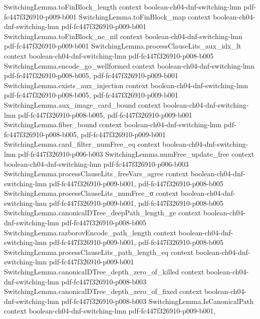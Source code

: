 \begin{lemma}
\proofstep
  {SwitchingLemma.toFinBlock_length}
  {context}
  {boolean-ch04-dnf-switching-lmn}
  {pdf-fc447f326910-p009-b001}
\proofstep
  {SwitchingLemma.toFinBlock_map}
  {context}
  {boolean-ch04-dnf-switching-lmn}
  {pdf-fc447f326910-p009-b001}
\proofstep
  {SwitchingLemma.toFinBlock_ne_nil}
  {context}
  {boolean-ch04-dnf-switching-lmn}
  {pdf-fc447f326910-p009-b001}
\proofstep
  {SwitchingLemma.processClauseLits_aux_idx_lt}
  {context}
  {boolean-ch04-dnf-switching-lmn}
  {pdf-fc447f326910-p008-b005}
\proofstep
  {SwitchingLemma.encode_go_wellformed}
  {context}
  {boolean-ch04-dnf-switching-lmn}
  {pdf-fc447f326910-p008-b005,
    pdf-fc447f326910-p009-b001}
\proofstep
  {SwitchingLemma.exists_aux_injection}
  {context}
  {boolean-ch04-dnf-switching-lmn}
  {pdf-fc447f326910-p008-b005,
    pdf-fc447f326910-p009-b001}
\proofstep
  {SwitchingLemma.aux_image_card_bound}
  {context}
  {boolean-ch04-dnf-switching-lmn}
  {pdf-fc447f326910-p008-b005,
    pdf-fc447f326910-p009-b001}
\proofstep
  {SwitchingLemma.fiber_bound}
  {context}
  {boolean-ch04-dnf-switching-lmn}
  {pdf-fc447f326910-p008-b005,
    pdf-fc447f326910-p009-b001}
\proofstep
  {SwitchingLemma.card_filter_numFree_eq}
  {context}
  {boolean-ch04-dnf-switching-lmn}
  {pdf-fc447f326910-p006-b003}
\proofstep
  {SwitchingLemma.numFree_update_free}
  {context}
  {boolean-ch04-dnf-switching-lmn}
  {pdf-fc447f326910-p006-b003}
\proofstep
  {SwitchingLemma.processClauseLits_freeVars_agree}
  {context}
  {boolean-ch04-dnf-switching-lmn}
  {pdf-fc447f326910-p009-b001,
    pdf-fc447f326910-p008-b005}
\proofstep
  {SwitchingLemma.processClauseLits_numFree_σ}
  {context}
  {boolean-ch04-dnf-switching-lmn}
  {pdf-fc447f326910-p009-b001,
    pdf-fc447f326910-p008-b005}
\proofstep
  {SwitchingLemma.canonicalDTree_deepPath_length_ge}
  {context}
  {boolean-ch04-dnf-switching-lmn}
  {pdf-fc447f326910-p008-b005}
\proofstep
  {SwitchingLemma.razborovEncode_path_length}
  {context}
  {boolean-ch04-dnf-switching-lmn}
  {pdf-fc447f326910-p009-b001,
    pdf-fc447f326910-p008-b005}
\proofstep
  {SwitchingLemma.processClauseLits_path_length_eq}
  {context}
  {boolean-ch04-dnf-switching-lmn}
  {pdf-fc447f326910-p009-b001}
\proofstep
  {SwitchingLemma.canonicalDTree_depth_zero_of_killed}
  {context}
  {boolean-ch04-dnf-switching-lmn}
  {pdf-fc447f326910-p008-b003}
\proofstep
  {SwitchingLemma.canonicalDTree_depth_zero_of_fixed}
  {context}
  {boolean-ch04-dnf-switching-lmn}
  {pdf-fc447f326910-p008-b003}
\proofstep
  {SwitchingLemma.IsCanonicalPath}
  {context}
  {boolean-ch04-dnf-switching-lmn}
  {pdf-fc447f326910-p009-b001,
}
\end{lemma}
